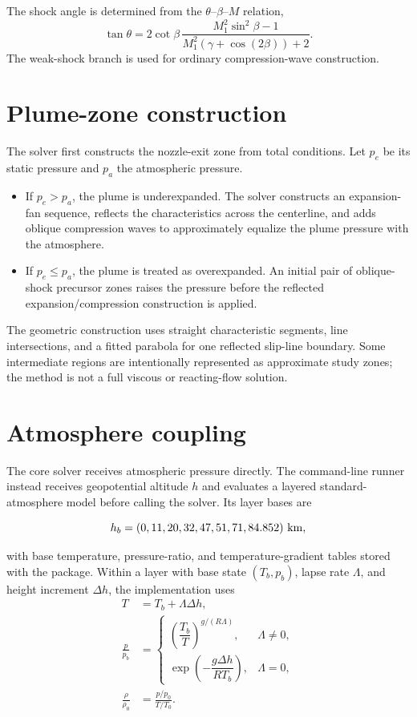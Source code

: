 \documentclass[11pt]{article}
\newcommand{\Mach}{\mathit{M}}
\newcommand{\gammaa}{\gamma}
\begin{document}
The shock angle is determined from the \(\theta\)--\(\beta\)--\(\Mach\)
relation,
\begin{equation}
  \tan\theta = 2\cot\beta\,
  \frac{\Mach_1^2\sin^2\beta-1}
       {\Mach_1^2\left(\gammaa+\cos(2\beta)\right)+2}.
\end{equation}
The weak-shock branch is used for ordinary compression-wave construction.

\section{Plume-zone construction}

The solver first constructs the nozzle-exit zone from total conditions.  Let
\(p_e\) be its static pressure and \(p_a\) the atmospheric pressure.

\begin{itemize}
  \item If \(p_e > p_a\), the plume is underexpanded.  The solver constructs
    an expansion-fan sequence, reflects the characteristics across the
    centerline, and adds oblique compression waves to approximately equalize
    the plume pressure with the atmosphere.
  \item If \(p_e \leq p_a\), the plume is treated as overexpanded.  An initial
    pair of oblique-shock precursor zones raises the pressure before the
    reflected expansion/compression construction is applied.
\end{itemize}

The geometric construction uses straight characteristic segments, line
intersections, and a fitted parabola for one reflected slip-line boundary.
Some intermediate regions are intentionally represented as approximate study
zones; the method is not a full viscous or reacting-flow solution.

\section{Atmosphere coupling}

The core solver receives atmospheric pressure directly.  The command-line
runner instead receives geopotential altitude \(h\) and evaluates a layered
standard-atmosphere model before calling the solver.  Its layer bases are

\[
  h_b = (0,11,20,32,47,51,71,84.852)\ {\rm km},
\]

with base temperature, pressure-ratio, and temperature-gradient tables stored
with the package.  Within a layer with base state \((T_b,p_b)\), lapse rate
\(\Lambda\), and height increment \(\Delta h\), the implementation uses
\begin{align}
  T &= T_b + \Lambda\Delta h, \\
  \frac{p}{p_b} &= \begin{cases}
    \left(\dfrac{T_b}{T}\right)^{g/(R\Lambda)}, & \Lambda\ne 0,\\[6pt]
    \exp\left(-\dfrac{g\Delta h}{R T_b}\right), & \Lambda=0,
  \end{cases} \\
  \frac{\rho}{\rho_0} &= \frac{p/p_0}{T/T_0}.
\end{align}
\end{document}

